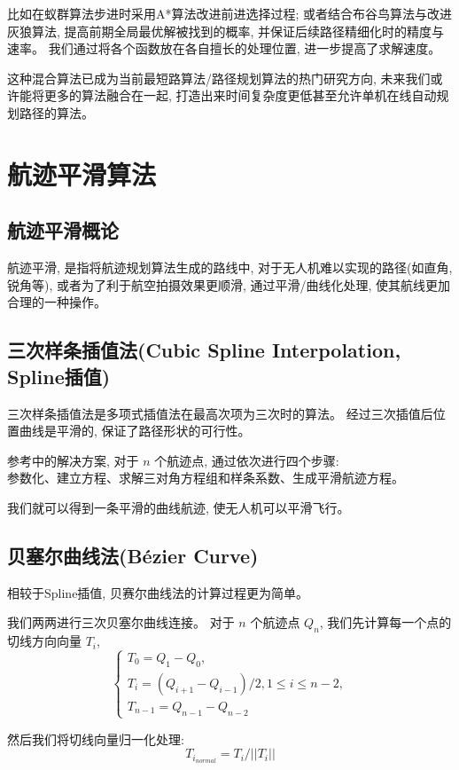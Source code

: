 \documentclass[oneside,UTF8]{ctexart}
\numberwithin{figure}{section} %
\begin{document}
比如在蚁群算法步进时采用A*算法改进前进选择过程;
或者结合布谷鸟算法与改进灰狼算法,
提高前期全局最优解被找到的概率,
并保证后续路径精细化时的精度与速率。
我们通过将各个函数放在各自擅长的处理位置,
进一步提高了求解速度。

这种混合算法已成为当前最短路算法/路径规划算法的热门研究方向,
未来我们或许能将更多的算法融合在一起,
打造出来时间复杂度更低甚至允许单机在线自动规划路径的算法。
\newpage\section{航迹平滑算法}
\subsection{航迹平滑概论}
航迹平滑,
是指将航迹规划算法生成的路线中,
对于无人机难以实现的路径(如直角,锐角等),
或者为了利于航空拍摄效果更顺滑,
通过平滑/曲线化处理,
使其航线更加合理的一种操作。
\subsection{三次样条插值法(Cubic Spline Interpolation, Spline插值)}
三次样条插值法是多项式插值法在最高次项为三次时的算法。
经过三次插值后位置曲线是平滑的,
保证了路径形状的可行性。

参考\cite{ref11}中的解决方案,
对于 $n$ 个航迹点,
通过依次进行四个步骤:\\
参数化、建立方程、求解三对角方程组和样条系数、生成平滑航迹方程。

我们就可以得到一条平滑的曲线航迹,
使无人机可以平滑飞行。

\subsection{贝塞尔曲线法(Bézier Curve)}
相较于Spline插值,
贝赛尔曲线法的计算过程更为简单。

我们两两进行三次贝塞尔曲线连接。
对于 $n$ 个航迹点 $Q_n$,
我们先计算每一个点的切线方向向量 $T_i$,
\begin{equation}
  \begin{cases}
    T_0 = Q_1 - Q_0 ,\\
    T_i = (Q_{i+1}-Q_{i-1})/2 , 1 \leq i \leq n-2 ,\\
    T_{n-1} = Q_{n-1} - Q_{n-2}
  \end{cases}
  \nonumber
\end{equation}

然后我们将切线向量归一化处理:
\[ T_{i_{normal}} = T_i / \lvert {\lvert T_i \rvert}\rvert \]
\end{document}

